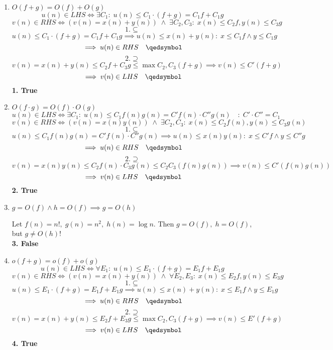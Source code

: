 \begin{enumerate}
    \item $O(f+g) = O(f) + O(g)$
        $$u(n) \in LHS \iff \exists C_1:\; u(n) \le C_1 \cdot (f+g) = C_1 f + C_1 g$$
        $$v(n) \in RHS \iff (v(n) = x(n) + y(n)) \;\wedge\; \exists C_2, C_3:\; x(n) \le C_2 f, y(n) \le C_3 g \quad$$
        $$1. \subseteq$$
        $$u(n) \le C_1 \cdot (f+g) = C_1 f + C_1 g \implies u(n) \le x(n) + y(n) :\; x \le C_1 f \wedge y \le C_1 g $$
        $$\implies u(n) \in RHS \quad \qedsymbol$$
        $$2. \supseteq$$
        $$v(n) = x(n) + y(n) \le C_2 f + C_3 g \le \max{C_2,C_3} (f+g) \implies v(n) \le C' (f+g) $$
        $$\implies v(n) \in LHS\quad  \qedsymbol$$
        \qedsymbol \textbf{1. True}\\
        \hrulefill

    \item $O(f\cdot g) = O(f) \cdot O(g)$
        $$u(n) \in LHS \iff \exists C_1:\; u(n) \le C_1 f(n) g(n) = C' f(n) \cdot C'' g(n) \quad :\; C'\cdot C'' = C_1$$
        $$v(n) \in RHS \iff (v(n) = x(n)y(n)) \;\wedge\; \exists C_2, C_3:\; x(n) \le C_2 f(n), y(n) \le C_3 g(n) \quad$$
        $$1. \subseteq$$
        $$ u(n) \le C_1 f(n) g(n) = C' f(n) \cdot C'' g(n) \implies u(n) \le x(n) y(n) :\; x \le C' f \wedge y \le C'' g $$
        $$\implies u(n) \in RHS\quad  \qedsymbol$$
        $$2. \supseteq$$
        $$v(n) = x(n)y(n) \le C_2 f(n) \cdot C_3 g(n) \le C_2 C_3 (f(n) g(n)) \implies v(n) \le C' (f(n)g(n)) $$
        $$\implies v(n) \in LHS\quad  \qedsymbol$$
        \qedsymbol \textbf{2. True}\\
        \hrulefill

    \item $g=O(f) \wedge h=O(f) \implies g = O(h)$
    
        Let $f(n) = n!,\; g(n) = n^2,\; h(n) = \log n$.
        Then $g = O(f),\; h = O(f)$, but $g \ne O(h)$! \\
        \qedsymbol \textbf{3. False}\\
        \hrulefill

    \item $o(f+g) = o(f) + o(g)$
        $$u(n) \in LHS \iff \forall E_1:\; u(n) \le E_1 \cdot (f+g) = E_1 f + E_1 g$$
        $$v(n) \in RHS \iff (v(n) = x(n) + y(n)) \;\wedge\; \forall E_2, E_3:\; x(n) \le E_2 f, y(n) \le E_3 g \quad$$
        $$1. \subseteq$$
        $$u(n) \le E_1 \cdot (f+g) = E_1 f + E_1 g \implies u(n) \le x(n) + y(n) :\; x \le E_1 f \wedge y \le E_1 g$$
        $$\implies u(n) \in RHS \quad \qedsymbol$$
        $$2. \supseteq$$
        $$v(n) = x(n) + y(n) \le E_2 f + E_3 g \le \max{C_2,C_3} (f+g) \implies v(n) \le E' (f+g) $$
        $$\implies v(n) \in LHS \quad \qedsymbol$$
        \qedsymbol \textbf{4. True}\\
        \hrulefill


\end{enumerate}
